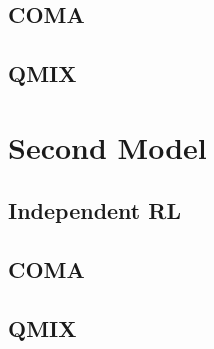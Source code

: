 \subsection{COMA}
\subsection{QMIX}

\section{Second Model}
\subsection{Independent RL}
\subsection{COMA}
\subsection{QMIX}